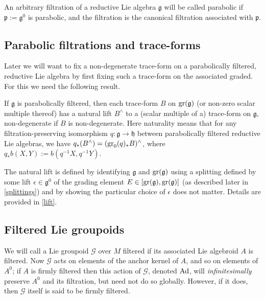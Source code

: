 \documentclass[leqno,12pt]{amsart} %
\begin{document}
\begin{definition}
  An arbitrary filtration of a reductive Lie algebra ${\mathfrak g} $ will be called {\df
    parabolic} if ${\mathfrak p}:={\mathfrak g}^0$ is parabolic, and the filtration is the
  canonical filtration associated with ${\mathfrak p} $.
\end{definition}

\subsection{Parabolic filtrations and trace-forms}\label{lift_}
Later we will want to fix a non-degenerate trace-form on a parabolically filtered,
reductive Lie algebra by first fixing such a trace-form on the associated graded. For this
we need the following result.

\begin{proposition} If ${\mathfrak g} $ is parabolically filtered, then each trace-form
  $B$ on $\operatorname{\operatorname{gr}}({\mathfrak g})$ (or non-zero scalar multiple thereof) has a {\df natural
    lift} $B^\wedge$ to a (scalar multiple of a) trace-form on ${\mathfrak g} $,
  non-degenerate if $B$ is non-degenerate. Here naturality means that for any
  filtration-preserving isomorphism $q \colon {\mathfrak g} \rightarrow {\mathfrak h} $
  between parabolically filtered reductive Lie algebras, we have
  $q_*(B^\wedge) = (\operatorname{\operatorname{gr}}_0(q)_*B)^\wedge$, where $q_*b(X,Y) := b(q^{-1}X, q^{-1}Y)$.
\end{proposition}
\noindent%
The natural lift is defined by identifying ${\mathfrak g} $ and $\operatorname{\operatorname{gr}}({\mathfrak g})$
using a splitting defined by some lift $\epsilon \in {\mathfrak g}^0$ of the grading
element $E \in [\operatorname{\operatorname{gr}}({\mathfrak g}), \operatorname{\operatorname{gr}}({\mathfrak g})]$ (as described later in
\ref{splittings}) and by showing the particular choice of $\epsilon$ does not
matter. Details are provided in \ref{lift}.

\subsection{Filtered Lie groupoids}\label{filtered_groupoids}
We will call a Lie groupoid ${\mathcal G} $ over $M$ {\df filtered} if its associated Lie
algebroid $A$ is filtered. Now ${\mathcal G} $ acts on elements of the anchor kernel of
$A$, and so on elements of $A^0$; if $A$ is firmly filtered then this action of
$\mathcal G$, denoted $\operatorname{Ad}$, will {\em infinitesimally} preserve $A^0$ and its
filtration, but need not do so globally. However, if it does, then $\mathcal G$ itself is
said to be {\df firmly filtered}.
\end{document}

